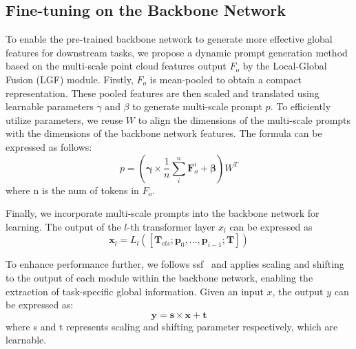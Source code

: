\subsection{Fine-tuning on the Backbone Network}
\label{sec:FT_backbone}
To enable the pre-trained backbone network to generate more effective global features for downstream tasks, we propose a dynamic prompt generation method based on the multi-scale point cloud features output $F_{o}$ by the Local-Global Fusion (LGF) module. Firstly, $F_{o}$ is mean-pooled to obtain a compact representation. These pooled features are then scaled and translated using learnable parameters $\gamma$ and $\beta$ to generate multi-scale prompt $p$. To efficiently utilize parameters, we reuse $W$ to align the dimensions of the multi-scale prompts with the dimensions of the backbone network features. The formula can be expressed as follows:
\begin{equation}
    p = \left( \boldsymbol{\gamma} \times \frac{1}{n}\sum_i^n{\boldsymbol{F}_{o}^i} + \boldsymbol{\beta} \right) W^T
\end{equation}
where n is the num of tokens in $F_o$.

Finally, we incorporate multi-scale prompts into the backbone network for learning. The output of the $l$-th transformer layer $x_l$ can be expressed as
\begin{equation}
    \boldsymbol{x}_l=L_l\left(\left[\boldsymbol{T}_{c l s} ; \boldsymbol{p}_{0}, \ldots, \boldsymbol{p}_{i-1} ; \boldsymbol{T}\right]\right)
\end{equation}

To enhance performance further, we follows ssf~\cite{lian2022scaling} and applies scaling and shifting to the output of each module within the backbone network, enabling the extraction of task-specific global information. Given an input $x$, the output $y$ can be expressed as:
\begin{equation}
    \boldsymbol{y} = \boldsymbol{s} \times \boldsymbol{x} + \boldsymbol{t}
\end{equation}
where s and t represents scaling and shifting parameter respectively, which are learnable.

